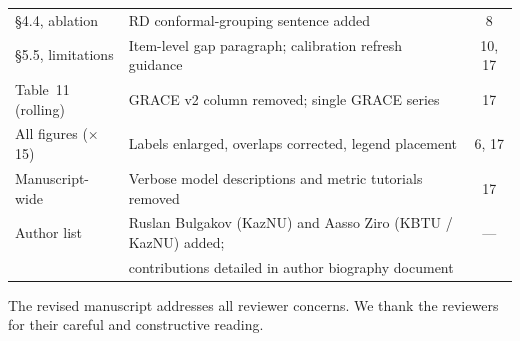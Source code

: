 \documentclass[11pt]{article}
\begin{document}
\begin{center}
\begin{tabular}{@{}lp{9.5cm}c@{}}
\S4.4, ablation & RD conformal-grouping sentence added & 8 \\
\S5.5, limitations & Item-level gap paragraph; calibration refresh guidance & 10, 17 \\
Table~11 (rolling) & GRACE v2 column removed; single GRACE series & 17 \\
All figures ($\times$15) & Labels enlarged, overlaps corrected, legend placement & 6, 17 \\
Manuscript-wide & Verbose model descriptions and metric tutorials removed & 17 \\
Author list & Ruslan Bulgakov (KazNU) and Aasso Ziro (KBTU / KazNU) added; & --- \\
           & contributions detailed in author biography document & \\
\bottomrule
\end{tabular}
\end{center}

\bigskip

The revised manuscript addresses all reviewer concerns. We thank the reviewers for
their careful and constructive reading.
\end{document}

